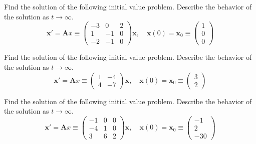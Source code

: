 {\begin{Exercise}
\end{Exercise}




\begin{Exercise}
  \label{exercise x'=(-3021-10-2-10)x}
  Find the solution of the following initial value problem.
  Describe the behavior of the solution as $t \to \infty$.
  \[
  \mathbf{x}' = \mathbf{A} x \equiv
  \begin{pmatrix}
    -3 & 0 & 2 \\
    1 & -1 & 0 \\
    -2 & -1 & 0
  \end{pmatrix} 
  \mathbf{x}, \quad 
  \mathbf{x}(0) = \mathbf{x}_0 \equiv
  \begin{pmatrix}
    1 \\
    0 \\
    0
  \end{pmatrix}
  \]

\end{Exercise}







\begin{Exercise}
  \label{exercise x'=(1-44-7)x}
  Find the solution of the following initial value problem.
  Describe the behavior of the solution as $t \to \infty$.
  \[
  \mathbf{x}' = \mathbf{A} x \equiv
  \begin{pmatrix}
    1 & -4 \\
    4 & -7
  \end{pmatrix} 
  \mathbf{x}, \quad 
  \mathbf{x}(0) = \mathbf{x}_0 \equiv
  \begin{pmatrix}
    3 \\
    2
  \end{pmatrix}
  \]

\end{Exercise}








\begin{Exercise}
  \label{exercise x'=(-100-410362)x}
  Find the solution of the following initial value problem.
  Describe the behavior of the solution as $t \to \infty$.
  \[
  \mathbf{x}' = \mathbf{A} x \equiv
  \begin{pmatrix}
    -1 & 0 & 0 \\
    -4 & 1 & 0 \\
    3 & 6 & 2
  \end{pmatrix} 
  \mathbf{x}, \quad 
  \mathbf{x}(0) = \mathbf{x}_0 \equiv
  \begin{pmatrix}
    -1 \\
    2 \\
    -30
  \end{pmatrix}
  \]


\end{Exercise}}
